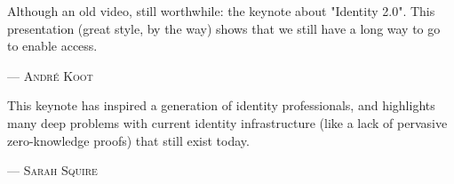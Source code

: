 Although an old video, still worthwhile: the keynote about "Identity 2.0". This presentation (great style, by the way) shows that we still have a long way to go to enable access.
\setlength{\parindent}{0cm}\par\textsc{ --- André Koot }\par\vspace{12pt}\setlength{\parindent}{15pt}

This keynote has inspired a generation of identity professionals, and highlights many deep problems with current identity infrastructure (like a lack of pervasive zero-knowledge proofs) that still exist today. 
\setlength{\parindent}{0cm}\par\textsc{ --- Sarah Squire }\par\vspace{12pt}\setlength{\parindent}{15pt}
